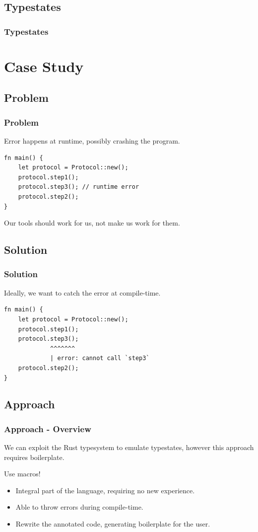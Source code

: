 \documentclass[bigger,notes]{beamer}
\begin{document}
\subsection{Typestates}
\begin{frame}
    \frametitle{Typestates}

\end{frame}

\section{Case Study}

\subsection{Problem}
\begin{frame}[fragile]
    \frametitle{Problem} %
    Error happens at runtime, possibly crashing the program.

    \begin{verbatim}
fn main() {
    let protocol = Protocol::new();
    protocol.step1();
    protocol.step3(); // runtime error
    protocol.step2();
}
    \end{verbatim}
    Our tools should work for us, not make us work for them.
\end{frame}

\subsection{Solution}
\begin{frame}[fragile]
    \frametitle{Solution}
    Ideally, we want to catch the error at compile-time.
    \begin{verbatim}
fn main() {
    let protocol = Protocol::new();
    protocol.step1();
    protocol.step3();
             ^^^^^^^
             | error: cannot call `step3`
    protocol.step2();
}
    \end{verbatim}

\end{frame}

\subsection{Approach}
\begin{frame}
    \frametitle{Approach - Overview}

    We can exploit the Rust typesystem to emulate typestates,
    however this approach requires boilerplate.

    Use macros!
    \begin{itemize}
        \item Integral part of the language, requiring no new experience.
        \item Able to throw errors during compile-time.
        \item Rewrite the annotated code, generating boilerplate for the user.
    \end{itemize}

\end{frame}
\end{document}
